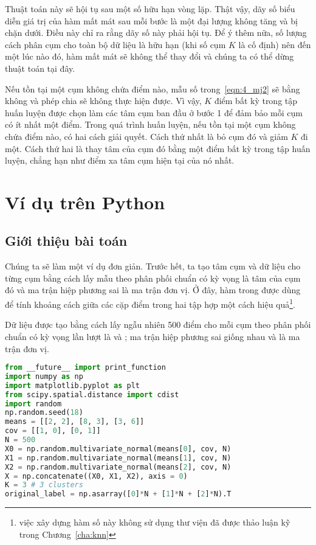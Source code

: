 Thuật toán này sẽ hội tụ sau một số hữu hạn vòng lặp. Thật vậy, dãy số biểu diễn giá trị của hàm mất mát sau mỗi bước là một đại
lượng không tăng và bị chặn dưới. Điều này chỉ ra rằng dãy số này phải hội tụ.
Để ý thêm nữa, số lượng cách phân cụm cho toàn bộ dữ liệu là hữu hạn (khi số
cụm $K$ là cố định) nên đến một lúc nào đó, hàm mất mát sẽ không thể thay
đổi và chúng ta có thể dừng thuật toán tại đây.

Nếu tồn tại một cụm không chứa điểm nào, mẫu số trong~\eqref{eqn:4_mj2} sẽ
bằng không và phép chia sẽ không thực hiện được. Vì vậy, $K$ điểm bất kỳ trong
tập huấn luyện được chọn làm các tâm cụm ban đầu ở bước 1 để đảm bảo mỗi
cụm có ít nhất một điểm. Trong quá trình huấn luyện, nếu tồn tại một cụm
không chứa điểm nào, có hai cách giải quyết. Cách thứ nhất là bỏ cụm đó
và giảm $K$ đi một. Cách thứ hai là thay tâm của cụm đó bằng một điểm
bất kỳ trong tập huấn luyện, chẳng hạn như điểm xa tâm cụm hiện tại của nó nhất.

\section{Ví dụ trên Python}


\subsection{Giới thiệu bài toán}
Chúng ta sẽ làm một ví dụ đơn giản. Trước hết, ta tạo tâm cụm và dữ liệu cho
từng cụm bằng cách lấy mẫu theo phân phối chuẩn có kỳ vọng là tâm của
cụm đó và ma trận hiệp phương sai là ma trận đơn vị. Ở đây, hàm
 trong  được dùng để
tính khoảng cách giữa các cặp điểm trong hai tập hợp một cách hiệu
quả\footnote{việc xây dựng hàm số này không sử dụng thư viện đã được thảo luận
kỹ trong Chương~\ref{cha:knn}}.

Dữ liệu được tạo bằng cách lấy ngẫu nhiên 500 điểm cho mỗi cụm theo phân
phối chuẩn có kỳ vọng lần lượt là  và
; ma trận hiệp phương sai giống nhau và là ma trận đơn vị.
\begin{lstlisting}[language=Python]
from __future__ import print_function 
import numpy as np 
import matplotlib.pyplot as plt
from scipy.spatial.distance import cdist
import random
np.random.seed(18)
means = [[2, 2], [8, 3], [3, 6]]
cov = [[1, 0], [0, 1]]
N = 500
X0 = np.random.multivariate_normal(means[0], cov, N)
X1 = np.random.multivariate_normal(means[1], cov, N)
X2 = np.random.multivariate_normal(means[2], cov, N)
X = np.concatenate((X0, X1, X2), axis = 0)
K = 3 # 3 clusters 
original_label = np.asarray([0]*N + [1]*N + [2]*N).T
\end{lstlisting}


